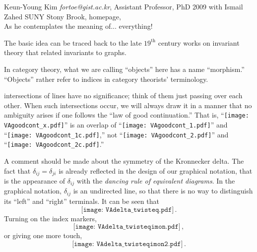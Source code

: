 \begin{description}
{Keun-Young Kim} {\em fortoe@gist.ac.kr}, %
Assistant Professor, PhD 2009  with Ismail Zahed SUNY Stony Brook,
{homepage},
\\ As he contemplates the meaning of...
 {everything!}

\bigskip

The basic idea can be traced back to the late $19^{\text{th}}$ century
works on invariant theory that related invariants to
graphs.\cite{Sylvester78,Clifford1878,Kempe1885,Cayley1857}

In category theory, what we are calling ``objects'' here has a name
``morphism.'' ``Objects'' rather refer to indices in category theorists'
terminology.

intersections of
lines have no significance; think of them just passing over each other.
When such intersections occur, we will always draw it in a manner that no
ambiguity arises if one follows the ``law of good continuation.'' That
is, ``\texttt{[image: VAgoodcont\_x.pdf]}'' is an
overlap of
``\texttt{[image: VAgoodcont\_1.pdf]}'' and
``\texttt{[image: VAgoodcont\_1c.pdf]},'' not
``\texttt{[image: VAgoodcont\_2.pdf]}'' and
``\texttt{[image: VAgoodcont\_2c.pdf]}.''

A comment should be made about the symmetry of the Kronnecker delta. The
fact that $\delta_{ij}=\delta_{ji}$ is {already reflected in the
design} of our graphical notation, that is the appearance of
$\delta_{ij}$ with the \textit{dancing rule of equivalent diagrams}. In
the graphical notation, $\delta_{ij}$ is an undirected line, so that
there is no way to distinguish its ``left'' and ``right'' terminals.
It can be seen that
\begin{equation}
    \texttt{[image: VAdelta\_twisteq.pdf]}\,.
    \label{eq:deltatwist}
\end{equation}
Turning on the index markers,
\begin{equation}
    \texttt{[image: VAdelta\_twisteqimon.pdf]}\,,
\end{equation}
or giving one more touch,
\begin{equation}
    \texttt{[image: VAdelta\_twisteqimon2.pdf]}\,.
    \label{eq:deltatwistimon}
\end{equation}


\end{description}

